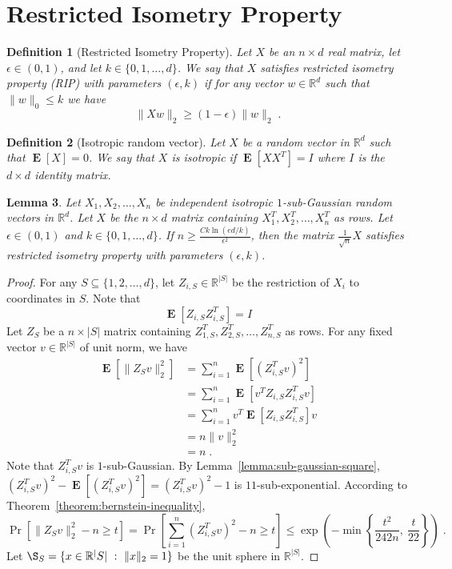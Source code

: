 \documentclass[12pt]{article}
\newtheorem{definition}{Definition}
\newtheorem{lemma}[definition]{Lemma}
\newcommand{\R}{\mathbb{R}}
\newcommand{\norm}[1]{\|{#1}\|}
\DeclareMathOperator*{\Exp}{\mathbf{E}}
\begin{document}
\section{Restricted Isometry Property}

\begin{definition}[Restricted Isometry Property]
Let $X$ be an $n \times d$ real matrix, let $\epsilon \in (0,1)$, and let $k \in
\{0,1,\dots,d\}$. We say that $X$ satisfies \emph{restricted isometry property
(RIP) with parameters $(\epsilon, k)$} if for any vector $w \in \R^d$ such that
$\norm{w}_0 \le k$ we have
$$
\norm{X w}_2 \ge (1 - \epsilon) \norm{w}_2 \; .
$$
\end{definition}

\begin{definition}[Isotropic random vector]
Let $X$ be a random vector in $\R^d$ such that $\Exp[X] = 0$.
We say that $X$ is \emph{isotropic} if $\Exp[X X^T] = I$ where $I$
is the $d \times d$ identity matrix.
\end{definition}


\begin{lemma}
Let $X_1, X_2, \dots, X_n$ be independent isotropic $1$-sub-Gaussian random
vectors in $\R^d$. Let $X$ be the $n \times d$ matrix containing $X_1^T, X_2^T,
\dots, X_n^T$ as rows. Let $\epsilon \in (0,1)$ and $k \in \{0,1,\dots,d\}$. If
$n \ge \frac{C k \ln(ed/k)}{\epsilon^2}$, then the matrix $\frac{1}{\sqrt{n}}X$
satisfies restricted isometry property with parameters $(\epsilon, k)$.
\end{lemma}

\begin{proof}
For any $S \subseteq \{1,2,\dots,d\}$, let $Z_{i,S} \in \R^{|S|}$ be
the restriction of $X_i$ to coordinates in $S$. Note that
$$
\Exp[Z_{i,S} Z_{i,S}^T] = I
$$
Let $Z_S$ be a $n \times |S|$ matrix containing $Z_{1,S}^T, Z_{2,S}^T, \dots, Z_{n,S}^T$ as rows.
For any fixed vector $v \in \R^{|S|}$ of unit norm, we have
\begin{align*}
\Exp\left[\norm{Z_S v}_2^2\right]
& = \sum_{i=1}^n \Exp\left[ \left(Z_{i,S}^T v \right)^2 \right] \\
& = \sum_{i=1}^n \Exp\left[ v^T Z_{i,S} Z_{i,S}^T v \right] \\
& = \sum_{i=1}^n v^T \Exp\left[ Z_{i,S} Z_{i,S}^T \right] v \\
& = n \norm{v}_2^2 \\
& = n \; .
\end{align*}
Note that $Z_{i,S}^T v$ is $1$-sub-Gaussian. By
Lemma~\ref{lemma:sub-gaussian-square}, $(Z_{i,S}^T v)^2 -
\Exp[(Z_{i,S}^T v)^2] = (Z_{i,S}^T v)^2 - 1$ is
$11$-sub-exponential. According to Theorem~\ref{theorem:bernstein-inequality},
$$
\Pr\left[ \norm{Z_S v}_2^2 - n \ge t \right]
= \Pr\left[ \sum_{i=1}^n \left(Z_{i,S}^T v \right)^2 - n \ge t \right]
\le
\exp\left( - \min \left\{ \frac{t^2}{242 n}, \ \frac{t}{22} \right\} \right) \; .
$$
Let $\S_{S} = \{ x \in \R^|S| ~:~ \norm{x}_2 = 1 \}$ be the unit sphere in $\R^|S|$.
\end{proof}
\end{document}
